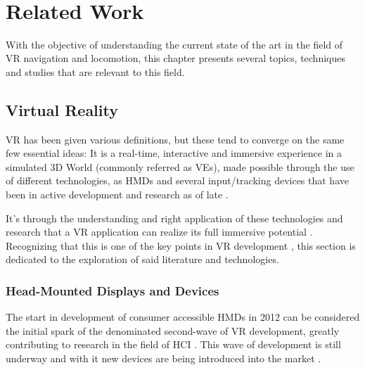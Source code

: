 
%
\glsresetall
\

\chapter{Related Work}
\label{cha:related_work}

With the objective of understanding the current state of the art in the field of \gls{VR} 
navigation and locomotion, this chapter presents several topics, techniques and studies that are relevant to this field.

\section{Virtual Reality}
\label{sec:vr-background}

\gls{VR} has been given various definitions\cite{Mazuryk1999}, but these tend to converge on the same few essential ideas: It is a real-time,
interactive and immersive experience in a simulated 3D World (commonly referred as \glspl{VE}), made possible through the use of different technologies, 
as \glspl{HMD} and several input/tracking devices that have been in active development and research as of late \cite{Boletsis2022}.

It's through the understanding and right application of these technologies and research that a \gls{VR} application can realize its full 
immersive potential \cite{Lee2020}. Recognizing that this is one of the key points in \gls{VR} development \cite{Schwind2019}, 
this section is dedicated to the exploration of said literature and technologies.

\subsection{Head-Mounted Displays and Devices}
\label{sec:hmds-devices}

The start in development of consumer accessible \glspl{HMD} in 2012 can be considered the initial spark of the denominated second-wave of \gls{VR} 
development, greatly contributing to research in the field of \gls{HCI} \cite{Anthes2016}. This wave of development is still underway and with it 
new devices are being introduced into the market \cite{Lee2020}.

